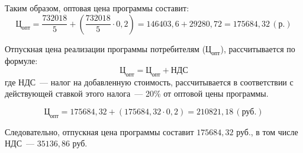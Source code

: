 Таким образом, оптовая цена программы составит:
\begin{equation*}
	\text{Ц}_{\text{опт}} = \frac{732018}{5} + \left( \frac{732018}{5} \cdot 0{,}2 \right) = 146403{,}6 + 29280{,}72 = 175684{,}32 \,(\text{р.})
\end{equation*}

Отпускная цена реализации программы потребителям ($\text{Ц}_{\text{опт}}$), рассчитывается по формуле:
\begin{equation*}
	\text{Ц}_{\text{опт}} = \text{Ц}_{\text{опт}} + \text{НДС}
\end{equation*}
где $\text{НДС}$~--- налог на добавленную стоимость, рассчитывается в соответствии с действующей ставкой этого налога~--- 20\% от оптовой цены программы.

\begin{equation*}
	\text{Ц}_{\text{опт}} = 175684{,}32 + (175684{,}32 \cdot 0{,}2) = 210821{,}18 \,(\text{руб.})
\end{equation*}

Следовательно, отпускная цена программы составит $175684{,}32$ руб., в том числе НДС~--- $35136{,}86$ руб.